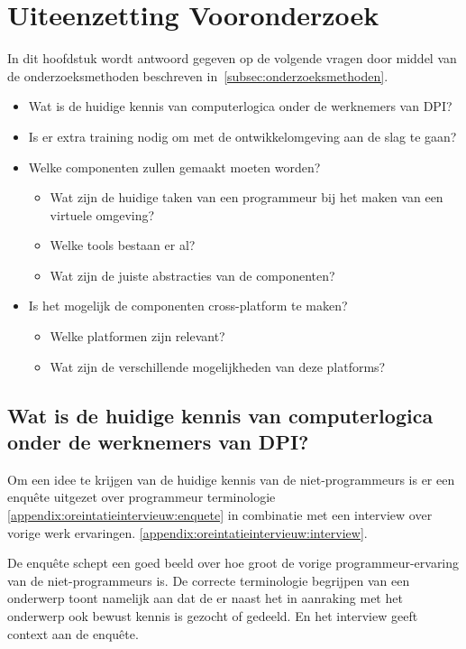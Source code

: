 \chapter{Uiteenzetting Vooronderzoek}
\label{ch:onderzoek}

In dit hoofdstuk wordt antwoord gegeven op de volgende vragen door middel van de onderzoeksmethoden beschreven in~\ref{subsec:onderzoeksmethoden}.

\begin{itemize}
\item Wat is de huidige kennis van computerlogica onder de werknemers van DPI?
\item Is er extra training nodig om met de ontwikkelomgeving aan de slag te gaan?
\item Welke componenten zullen gemaakt moeten worden?
	\begin{itemize}
	\item Wat zijn de huidige taken van een programmeur bij het maken van een virtuele omgeving?
	\item Welke tools bestaan er al?
	\item Wat zijn de juiste abstracties van de componenten? 
	\end{itemize}
\item Is het mogelijk de componenten cross-platform te maken?
	\begin{itemize}
	\item Welke platformen zijn relevant?
	\item Wat zijn de verschillende mogelijkheden van deze platforms?
	\end{itemize}
\end{itemize}

\section{Wat is de huidige kennis van computerlogica onder de werknemers van DPI?}
Om een idee te krijgen van de huidige kennis van de niet-programmeurs is er een enquête uitgezet over programmeur terminologie \ref{appendix:oreintatieintervieuw:enquete} in combinatie met een interview over vorige werk ervaringen. \ref{appendix:oreintatieintervieuw:interview}. 

De enquête schept een goed beeld over hoe groot de vorige programmeur-ervaring van de niet-programmeurs is. De correcte terminologie begrijpen van een onderwerp toont namelijk aan dat de er naast het in aanraking met het onderwerp ook bewust kennis is gezocht of gedeeld. En het interview geeft context aan de enquête.


